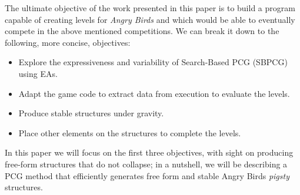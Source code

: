 \documentclass[sigconf]{acmart}
\begin{document}
The ultimate objective of the work presented in this paper is to
build a program capable of creating levels for \textit{Angry Birds}
and which would be able to eventually compete in the above mentioned
competitions. We can break it down to the following, more concise,
objectives: 

\begin{itemize}
	\item Explore the expressiveness and variability of Search-Based PCG (SBPCG) using EAs.
	\item Adapt the game code to extract data from execution to 
	evaluate the levels.
	\item Produce stable structures under gravity.
	\item Place other elements on the structures to complete the levels.
\end{itemize} 

In this paper we will focus on the first three objectives, with sight
on producing free-form structures that do not collapse; in a nutshell,
we will be describing a PCG method that efficiently generates free
form and stable Angry Birds {\em pigsty} structures.


\end{document}
